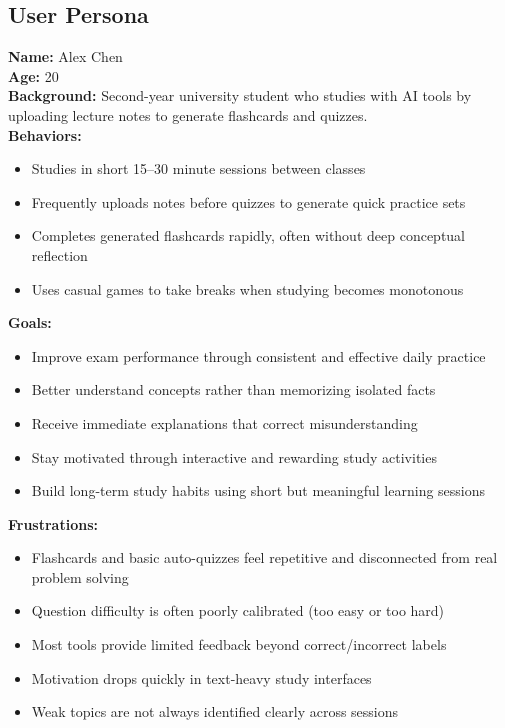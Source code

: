 \documentclass[12pt]{article}
\begin{document}
\subsection{User Persona}

\textbf{Name:} Alex Chen \\
\textbf{Age:} 20 \\
\textbf{Background:} Second-year university student who studies with AI tools by uploading lecture notes to generate flashcards and quizzes. \\

\textbf{Behaviors:}
\begin{itemize}
    \item Studies in short 15--30 minute sessions between classes
    \item Frequently uploads notes before quizzes to generate quick practice sets
    \item Completes generated flashcards rapidly, often without deep conceptual reflection
    \item Uses casual games to take breaks when studying becomes monotonous
\end{itemize}

\textbf{Goals:}
\begin{itemize}
    \item Improve exam performance through consistent and effective daily practice
    \item Better understand concepts rather than memorizing isolated facts
    \item Receive immediate explanations that correct misunderstanding
    \item Stay motivated through interactive and rewarding study activities
    \item Build long-term study habits using short but meaningful learning sessions
\end{itemize}

\textbf{Frustrations:}
\begin{itemize}
    \item Flashcards and basic auto-quizzes feel repetitive and disconnected from real problem solving
    \item Question difficulty is often poorly calibrated (too easy or too hard)
    \item Most tools provide limited feedback beyond correct/incorrect labels
    \item Motivation drops quickly in text-heavy study interfaces
    \item Weak topics are not always identified clearly across sessions
\end{itemize}
\end{document}
